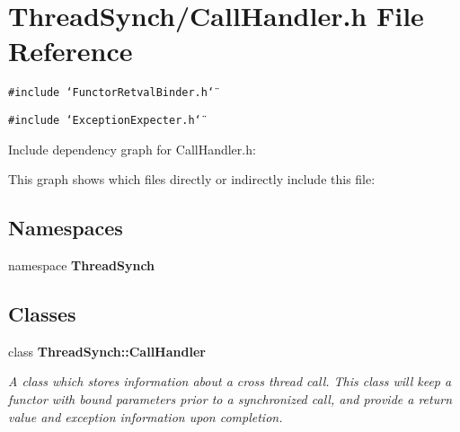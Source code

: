 \section{Thread\-Synch/Call\-Handler.h File Reference}
\label{_call_handler_8h}
{\tt \#include \char`\"{}Functor\-Retval\-Binder.h\char`\"{}}\par
{\tt \#include \char`\"{}Exception\-Expecter.h\char`\"{}}\par


Include dependency graph for Call\-Handler.h:

This graph shows which files directly or indirectly include this file:\subsection*{Namespaces}
\begin{CompactItemize}
\item 
namespace {\bf Thread\-Synch}
\end{CompactItemize}
\subsection*{Classes}
\begin{CompactItemize}
\item 
class {\bf Thread\-Synch::Call\-Handler}
\begin{CompactList}\small\item\em A class which stores information about a cross thread call. This class will keep a functor with bound parameters prior to a synchronized call, and provide a return value and exception information upon completion. \item\end{CompactList}\end{CompactItemize}

